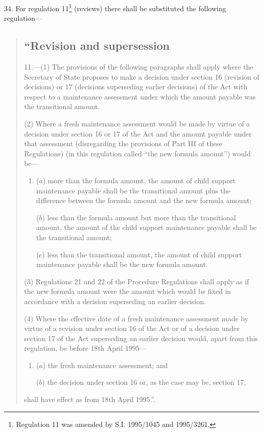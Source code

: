 \documentclass[12pt,a4paper]{article}
\begin{document}
34.  For regulation 11\footnote{\frenchspacing Regulation 11 was amended by S.I. 1995/1045 and 1995/3261.} (reviews) there shall be substituted the following regulation—
\begin{quotation}
\subsection*{“Revision and supersession}

11.—(1) The provisions of the following paragraphs shall apply where the Secretary of State proposes to make a decision under section 16 (revision of decisions) or 17 (decisions superseding earlier decisions) of the Act with respect to a maintenance assessment under which the amount payable was the transitional amount.

(2) Where a fresh maintenance assessment would be made by virtue of a decision under section 16 or 17 of the Act and the amount payable under that assessment (disregarding the provisions of Part III of these Regulations) (in this regulation called “the new formula amount”) would be—
\begin{enumerate}\item[]
($a$) more than the formula amount, the amount of child support maintenance payable shall be the transitional amount plus the difference between the formula amount and the new formula amount;

($b$) less than the formula amount but more than the transitional amount, the amount of the child support maintenance payable shall be the transitional amount;

($c$) less than the transitional amount, the amount of child support maintenance payable shall be the new formula amount.
\end{enumerate}

(3) Regulations 21 and 22 of the Procedure Regulations shall apply as if the new formula amount were the amount which would be fixed in accordance with a decision superseding an earlier decision.

(4) Where the effective date of a fresh maintenance assessment made by virtue of a revision under section 16 of the Act or of a decision under section 17 of the Act superseding an earlier decision would, apart from this regulation, be before 18th April 1995—
\begin{enumerate}\item[]
($a$) the fresh maintenance assessment; and

($b$) the decision under section 16 or, as the case may be, section 17,
\end{enumerate}
shall have effect as from 18th April 1995.”.
\end{quotation}
\end{document}
